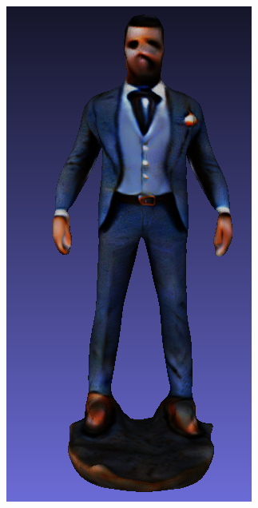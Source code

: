 \begin{figure}[ht]
\begin{subfigure}[b]{0.15\textwidth}
        \includegraphics[width=\textwidth]{figures/appendix/bias_rich_genie_2.png}
        \caption{}
    \end{subfigure}
    \begin{subfigure}[b]{0.16\textwidth}

\end{subfigure}
\end{figure}
